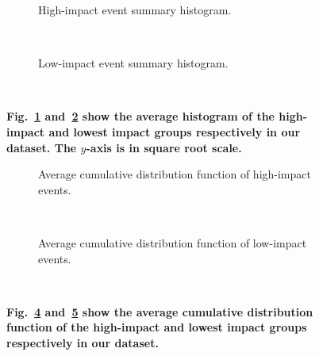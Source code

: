 \documentclass[10pt,letterpaper]{article}
\newcommand{\newtext}[1]{{\leavevmode\color{blue}#1}}
\begin{document}

\begin{figure}
  \centering
  \begin{subfigure}{\textwidth}
    \caption{High-impact event summary histogram. %
    }
    \label{fig:highest}
  \end{subfigure}%

  ~%
  \begin{subfigure}{\textwidth}
    \caption{Low-impact event summary histogram. %
    }
    \label{fig:low}
  \end{subfigure}%
  ~ %

  \caption{\textbf{Fig.~\ref{fig:highest} and~\ref{fig:low} show the average
    histogram of the high-impact and lowest impact groups respectively in our dataset. The $y$-axis is in square root
      scale.
    }}\label{fig:histograms}
\end{figure}
\begin{figure}
  \centering
  \begin{subfigure}{.5\textwidth}
    \caption{Average cumulative distribution function of high-impact events. %
    }
    \label{fig:cdf-highest}
  \end{subfigure}%
  ~%
  \begin{subfigure}{.5\textwidth}
    \caption{Average cumulative distribution function of low-impact events. %
    }
    \label{fig:cdf-lowest}
  \end{subfigure}%
  ~ %

  \caption{\textbf{\newtext{
        Fig.~\ref{fig:cdf-highest} and~\ref{fig:cdf-lowest} show the average
    cumulative distribution function of the high-impact and lowest impact groups respectively in our dataset. }
    }}\label{fig:cdfs}
\end{figure}
\end{document}
